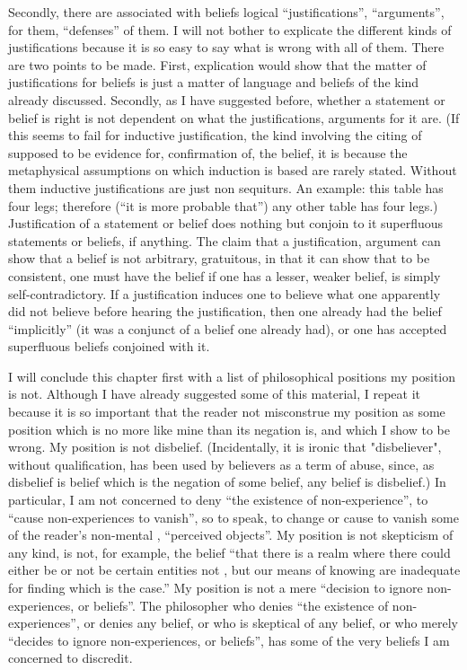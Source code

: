 Secondly, there are associated with beliefs logical \enquote{justifications}, \enquote{arguments}, for them, \enquote{defenses} of them. I will not bother to explicate the different kinds of justifications because it is so easy to say what is wrong with all of them. There are two points to be made. First, explication would show that the matter of justifications for beliefs is just a matter of language and beliefs of the kind already discussed. Secondly, as I have suggested before, whether a statement or belief is right is not dependent on what the justifications, arguments for it are. (If this seems to fail for inductive justification, the kind involving the citing of  supposed to be evidence for, confirmation of, the belief, it is because the metaphysical assumptions on which induction is based are rarely stated. Without them inductive justifications are just non sequiturs. An example: this table has four legs; therefore (\enquote{it is more probable that}) any other table has four legs.) Justification of a statement or belief does nothing but conjoin to it superfluous statements or beliefs, if anything. The claim that a justification, argument can show that a belief is not arbitrary, gratuitous, in that it can show that to be consistent, one must have the belief if one has a lesser, weaker belief, is simply self-contradictory. If a justification induces one to believe what one apparently did not believe before hearing the justification, then one already had the belief \enquote{implicitly} (it was a conjunct of a belief one already had), or one has accepted superfluous beliefs conjoined with it. 

I will conclude this chapter first with a list of philosophical positions my position is not. Although I have already suggested some of this material, I repeat it because it is so important that the reader not misconstrue my position as some position which is no more like mine than its negation is, and which I show to be wrong. My position is not disbelief. (Incidentally, it is ironic that "disbeliever", without qualification, has been used by believers as a term of abuse, since, as disbelief is belief which is the negation of some belief, any belief is disbelief.) In particular, I am not concerned to deny \enquote{the existence of non-experience}, to \enquote{cause non-experiences to vanish}, so to speak, to change or cause to vanish some of the reader's non-mental , \enquote{perceived objects}. My position is not skepticism of any kind, is not, for example, the belief \enquote{that there is a realm where there could either be or not be certain entities not , but our means of knowing are inadequate for finding which is the case.} My position is not a mere \enquote{decision to ignore non-experiences, or beliefs}. The philosopher who denies \enquote{the existence of non-experiences}, or denies any belief, or who is skeptical of any belief, or who merely \enquote{decides to ignore non-experiences, or beliefs}, has some of the very beliefs I am concerned to discredit. 

